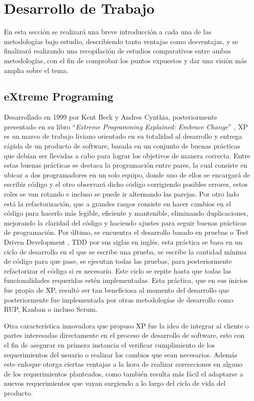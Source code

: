 \documentclass[a4paper,10pt]{article}
\begin{document}
	\section{Desarrollo de Trabajo}
	En esta sección se realizará una breve introducción a cada una de las metodologías bajo estudio, describiendo tanto ventajas como desventajas, y se finalizará realizando una recopilación de estudios comparativos entre ambas metodologías, con el fin de comprobar los puntos expuestos y dar una visión más amplia sobre el tema.
	\subsection{eXtreme Programing}
	Desarrollado en 1999 por Kent Beck y Andres Cynthia, posteriormente presentado en su libro “\textit{Extreme Programming Explained: Embrace Change}” \parencite{Beck_Andres_2005}, XP es un marco de trabajo liviano orientado en su totalidad al desarrollo y entrega rápida de un producto de software, basada en un conjunto de buenas prácticas que debían ser llevadas a cabo para lograr los objetivos de manera correcta. Entre estas buenas prácticas se destaca la programación entre pares, la cual consiste en ubicar a dos programadores en un solo equipo, donde uno de ellos se encargará de escribir código y el otro observará dicho código corrigiendo posibles errores, estos roles se van rotando e incluso se puede ir alternando las parejas. Por otro lado está la refactorización, que a grandes rasgos consiste en hacer cambios en el código para hacerlo más legible, eficiente y mantenible, eliminando duplicaciones, mejorando la claridad del código y haciendo ajustes para seguir buenas prácticas de programación. Por último, se encuentra el desarrollo basado en pruebas o Test Driven Development \parencite{Beck_2003}, TDD por sus siglas en inglés, esta práctica se basa en un ciclo de desarrollo en el que se escribe una prueba, se escribe la cantidad mínima de código para que pase, se ejecutan todas las pruebas, para posteriormente refactorizar el código si es necesario. Este ciclo se repite hasta que todas las funcionalidades requeridas estén implementadas. Esta práctica, que en sus inicios fue propia de XP, resultó ser tan beneficiosa al momento del desarrollo que posteriormente fue implementada por otras metodologías de desarrollo como RUP, Kanban o incluso Scrum.
	
	Otra característica innovadora que propuso XP fue la idea de integrar al cliente o partes interesadas directamente en el proceso de desarrollo de software, esto con el fin de asegurar en primera instancia el verificar cumplimiento de los requerimientos del usuario o realizar los cambios que sean necesarios. Además este enfoque otorga ciertas ventajas a la hora de realizar correcciones en alguno de los requerimientos planteados, como también resulta más fácil el adaptarse a nuevos requerimientos que vayan surgiendo a lo largo del ciclo de vida del producto.
	
\end{document}
